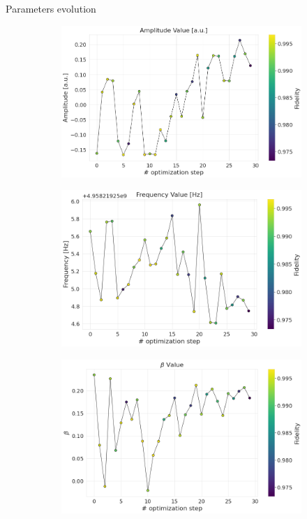 \documentclass[aspectratio=169,10pt]{beamer}
\begin{document}
\begin{frame}[t,fragile]{Parameters evolution}
\begin{figure}
  \end{figure}
    \begin{figure}
    \begin{subfigure}[t]{0.315\textwidth}
      \includegraphics[width=\textwidth]{figures/CMA_amplitude.png}
    \end{subfigure}
        \begin{subfigure}[t]{0.315\textwidth}
      \includegraphics[width=\textwidth]{figures/CMA_frequency.png}
    \end{subfigure}
        \begin{subfigure}[t]{0.315\textwidth}
      \includegraphics[width=\textwidth]{figures/beta_CMA.png}
    \end{subfigure}
  \end{figure}
\end{frame}
\end{document}
